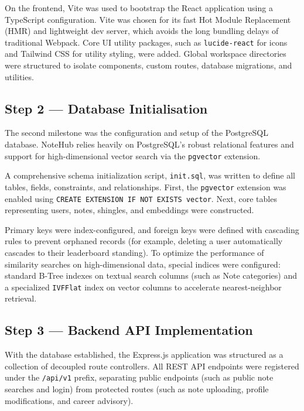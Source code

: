 \documentclass[12,Times new Roman,a4paper]{report}
\begin{document}
On the frontend, Vite was used to bootstrap the React application using a TypeScript configuration. Vite was chosen for its fast Hot Module Replacement (HMR) and lightweight dev server, which avoids the long bundling delays of traditional Webpack. Core UI utility packages, such as \texttt{lucide-react} for icons and Tailwind CSS for utility styling, were added. Global workspace directories were structured to isolate components, custom routes, database migrations, and utilities.

\subsection{Step 2 — Database Initialisation}

The second milestone was the configuration and setup of the PostgreSQL database. NoteHub relies heavily on PostgreSQL's robust relational features and support for high-dimensional vector search via the \texttt{pgvector} extension.

A comprehensive schema initialization script, \texttt{init.sql}, was written to define all tables, fields, constraints, and relationships. First, the \texttt{pgvector} extension was enabled using \texttt{CREATE EXTENSION IF NOT EXISTS vector}. Next, core tables representing users, notes, shingles, and embeddings were constructed. 

Primary keys were index-configured, and foreign keys were defined with cascading rules to prevent orphaned records (for example, deleting a user automatically cascades to their leaderboard standing). To optimize the performance of similarity searches on high-dimensional data, special indices were configured: standard B-Tree indexes on textual search columns (such as Note categories) and a specialized \texttt{IVFFlat} index on vector columns to accelerate nearest-neighbor retrieval.

\subsection{Step 3 — Backend API Implementation}

With the database established, the Express.js application was structured as a collection of decoupled route controllers. All REST API endpoints were registered under the \texttt{/api/v1} prefix, separating public endpoints (such as public note searches and login) from protected routes (such as note uploading, profile modifications, and career advisory).
\end{document}
